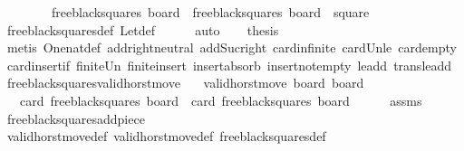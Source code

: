 \begin{isabellebody}
\ \ \ \ \ \ \ \ free{\isacharunderscore}black{\isacharunderscore}squares\ board\ {\isacharequal}\ free{\isacharunderscore}black{\isacharunderscore}squares\ {\isacharquery}board{\isacharprime}\ {\isasymunion}\ {\isacharbraceleft}square{\isacharbraceright}{\isachardoublequoteclose}\isanewline
\ \ \ \ \isamarkupfalse%
\ free{\isacharunderscore}black{\isacharunderscore}squares{\isacharunderscore}def\ Let{\isacharunderscore}def\isanewline
\ \ \ \ \isamarkupfalse%
\ auto\isanewline
\ \ \isamarkupfalse%
\ {\isacharquery}thesis\isanewline
\ \ \ \ \isamarkupfalse%
\ {\isacharparenleft}metis\ One{\isacharunderscore}nat{\isacharunderscore}def\ add{\isachardot}right{\isacharunderscore}neutral\ add{\isacharunderscore}Suc{\isacharunderscore}right\ card{\isachardot}infinite\ card{\isacharunderscore}Un{\isacharunderscore}le\ card{\isacharunderscore}empty\ card{\isacharunderscore}insert{\isacharunderscore}if\ finite{\isacharunderscore}Un\ finite{\isacharunderscore}insert\ insert{\isacharunderscore}absorb\ insert{\isacharunderscore}not{\isacharunderscore}empty\ le{\isacharunderscore}add{}\ trans{\isacharunderscore}le{\isacharunderscore}add{}{\isacharparenright}\isanewline
{}\isamarkupfalse%
%
\endisatagproof
{\isafoldproof}%
%
\isadelimproof
\isanewline
%
\endisadelimproof
\isanewline
{}\isamarkupfalse%
\ free{\isacharunderscore}black{\isacharunderscore}squares{\isacharunderscore}valid{\isacharunderscore}horst{\isacharunderscore}move{\isacharcolon}\isanewline
\ \ \ {\isachardoublequoteopen}valid{\isacharunderscore}horst{\isacharunderscore}move\ board\ board{\isacharprime}{\isachardoublequoteclose}\isanewline
\ \ \ {\isachardoublequoteopen}card\ {\isacharparenleft}free{\isacharunderscore}black{\isacharunderscore}squares\ board{\isacharparenright}\ {\isasymle}\ card\ {\isacharparenleft}free{\isacharunderscore}black{\isacharunderscore}squares\ board{\isacharprime}{\isacharparenright}\ {\isacharplus}\ {}{\isachardoublequoteclose}\isanewline
%
\isadelimproof
\ \ %
\endisadelimproof
%
\isatagproof
{}\isamarkupfalse%
\ assms\isanewline
\ \ \isamarkupfalse%
\ free{\isacharunderscore}black{\isacharunderscore}squares{\isacharunderscore}add{\isacharunderscore}piece\isanewline
\ \ \isamarkupfalse%
\ valid{\isacharunderscore}horst{\isacharunderscore}move{\isacharunderscore}def\ valid{\isacharunderscore}horst{\isacharunderscore}move{\isacharprime}{\isacharunderscore}def\ free{\isacharunderscore}black{\isacharunderscore}squares{\isacharunderscore}def\isanewline

\end{isabellebody}
